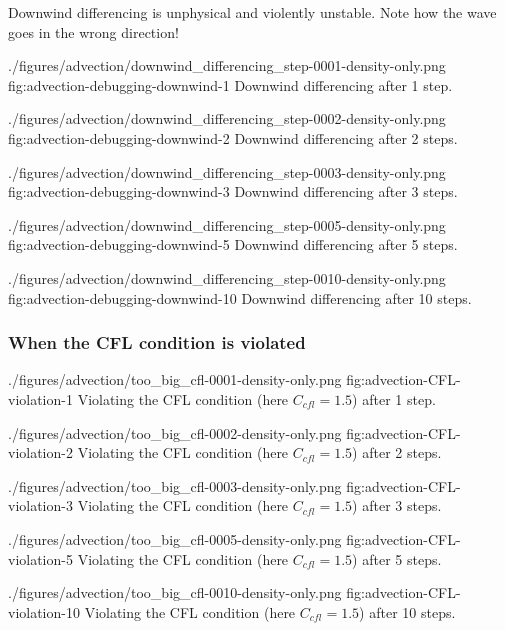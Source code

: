 Downwind differencing is unphysical and violently unstable.
Note how the wave goes in the wrong direction!


\quickfigcap
	{./figures/advection/downwind_differencing_step-0001-density-only.png}
	{fig:advection-debugging-downwind-1}
	{Downwind differencing after 1 step.}

\quickfigcap
	{./figures/advection/downwind_differencing_step-0002-density-only.png}
	{fig:advection-debugging-downwind-2}
	{Downwind differencing after 2 steps.}

\quickfigcap
	{./figures/advection/downwind_differencing_step-0003-density-only.png}
	{fig:advection-debugging-downwind-3}
	{Downwind differencing after 3 steps.}

\quickfigcap
	{./figures/advection/downwind_differencing_step-0005-density-only.png}
	{fig:advection-debugging-downwind-5}
	{Downwind differencing after 5 steps.}

\quickfigcap
	{./figures/advection/downwind_differencing_step-0010-density-only.png}
	{fig:advection-debugging-downwind-10}
	{Downwind differencing after 10 steps.}








\subsubsection{When the CFL condition is violated}


\quickfigcap
	{./figures/advection/too_big_cfl-0001-density-only.png}
	{fig:advection-CFL-violation-1}
	{Violating the CFL condition (here $C_{cfl} = 1.5$) after 1 step.}

\quickfigcap
	{./figures/advection/too_big_cfl-0002-density-only.png}
	{fig:advection-CFL-violation-2}
	{Violating the CFL condition (here $C_{cfl} = 1.5$) after 2 steps.}

\quickfigcap
	{./figures/advection/too_big_cfl-0003-density-only.png}
	{fig:advection-CFL-violation-3}
	{Violating the CFL condition (here $C_{cfl} = 1.5$) after 3 steps.}

\quickfigcap
	{./figures/advection/too_big_cfl-0005-density-only.png}
	{fig:advection-CFL-violation-5}
	{Violating the CFL condition (here $C_{cfl} = 1.5$) after 5 steps.}

\quickfigcap
	{./figures/advection/too_big_cfl-0010-density-only.png}
	{fig:advection-CFL-violation-10}
	{Violating the CFL condition (here $C_{cfl} = 1.5$) after 10 steps.}

